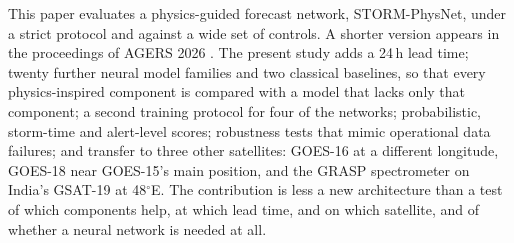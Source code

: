 \documentclass[a4paper,fleqn]{cas-dc}
\begin{document}
This paper evaluates a physics-guided forecast network, STORM-PhysNet, under a strict protocol and against a
wide set of controls. A shorter version appears in the proceedings of AGERS 2026 \citep{bn2026agers}. The
present study adds a 24\,h lead time; twenty further neural model families and two classical
baselines, so that every
physics-inspired component is compared with a model that lacks only that component; a second training protocol for
four of the networks; probabilistic,
storm-time and alert-level scores; robustness tests that mimic operational data failures; and transfer to
three other satellites: GOES-16 at a different longitude, GOES-18 near GOES-15's main position, and the
GRASP spectrometer on India's GSAT-19 at 48\(^\circ\)E. The contribution is less a new architecture than a
test of which components help, at which lead time, and on which satellite, and of whether a neural network is
needed at all.

\end{document}
